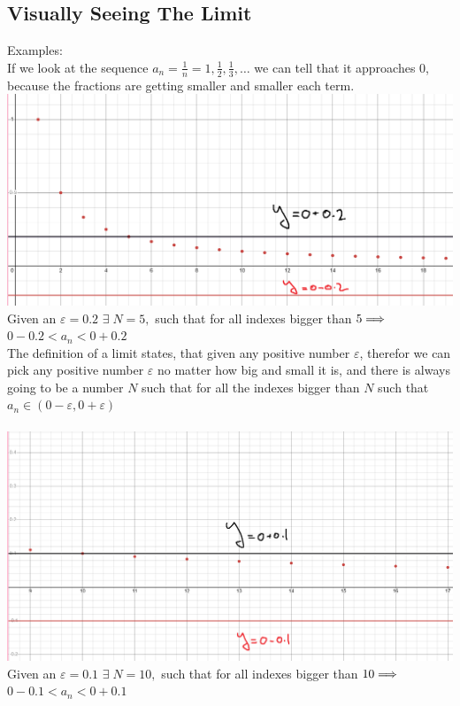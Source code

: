 \subsection{Visually Seeing The Limit}
\noindent Examples:\\
If we look at the sequence $a_n = \frac{1}{n} = 1,\frac{1}{2},\frac{1}{3},\ldots$ we can tell that it approaches $0$, because the fractions are getting smaller and smaller each term.\\
\includegraphics[scale = 0.7]{pictures/Graph1.png}
Given an $\varepsilon = 0.2$ $\exists\; N = 5,$ such that for all indexes bigger than $5\\ \Longrightarrow$ $0-0.2<a_n<0+0.2$\\
The definition of a limit states, that given any positive number $\varepsilon$, therefor we can pick any positive number $\varepsilon$ no matter how big and small it is, and there is always going to be a number $N$ such that for all the indexes bigger than $N$ such that $a_n\in(0-\varepsilon,0+\varepsilon)$\\\\
\includegraphics[scale=0.7]{pictures/Graph2.png}
Given an $\varepsilon = 0.1$ $\exists\; N = 10,$ such that for all indexes bigger than $10\\ \Longrightarrow$ $0-0.1<a_n<0+0.1$

